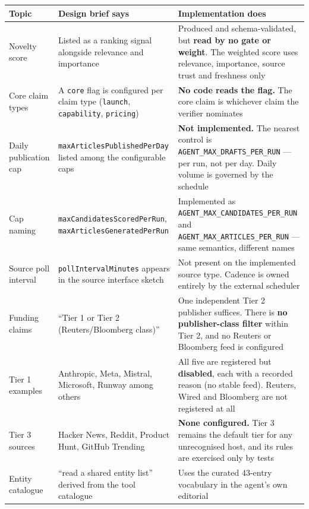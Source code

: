 \documentclass[11pt,a4paper]{article}
\newcommand{\var}[1]{\texttt{\small\hyphenpenalty=0\exhyphenpenalty=0\relax #1}}
\newcommand{\us}{\_\discretionary{}{}{}}
\newcommand{\brk}{\hyphenpenalty=0\exhyphenpenalty=0\relax}
\newcommand{\code}[1]{\texttt{\small\brk #1}}
\begin{document}
\begin{center}
\footnotesize
\begin{tabularx}{\textwidth}{@{}>{\RaggedRight}p{4.2cm} >{\RaggedRight}p{4.9cm} >{\RaggedRight}X@{}}
\toprule
\textbf{Topic} & \textbf{Design brief says} & \textbf{Implementation does} \\
\midrule
Novelty score & Listed as a ranking signal alongside relevance and importance &
  Produced and schema-validated, but \textbf{read by no gate or weight}. The
  weighted score uses relevance, importance, source trust and freshness only \\
Core claim types & A \code{core} flag is configured per claim type
  (\code{launch}, \code{capability}, \code{pricing}) &
  \textbf{No code reads the flag.} The core claim is whichever claim the verifier
  nominates \\
Daily publication cap & \code{maxArticlesPublishedPerDay} listed among the
  configurable caps & \textbf{Not implemented.} The nearest control is
  \var{AGENT\us MAX\us DRAFTS\us PER\us RUN} --- per run, not per day. Daily volume
  is governed by the schedule \\
Cap naming & \code{maxCandidatesScoredPerRun},
  \code{maxArticlesGeneratedPerRun} & Implemented as
  \var{AGENT\us MAX\us CANDIDATES\us PER\us RUN} and
  \var{AGENT\us MAX\us ARTICLES\us PER\us RUN} --- same semantics, different names \\
Source poll interval & \code{pollIntervalMinutes} appears in the source interface
  sketch & Not present on the implemented source type. Cadence is owned entirely
  by the external scheduler \\
Funding claims & ``Tier 1 or Tier 2 (Reuters/Bloomberg class)'' &
  One independent Tier 2 publisher suffices. There is \textbf{no publisher-class
  filter} within Tier 2, and no Reuters or Bloomberg feed is configured \\
Tier 1 examples & Anthropic, Meta, Mistral, Microsoft, Runway among others &
  All five are registered but \textbf{disabled}, each with a recorded reason (no
  stable feed). Reuters, Wired and Bloomberg are not registered at all \\
Tier 3 sources & Hacker News, Reddit, Product Hunt, GitHub Trending &
  \textbf{None configured.} Tier 3 remains the default tier for any unrecognised
  host, and its rules are exercised only by tests \\
Entity catalogue & ``read a shared entity list'' derived from the tool catalogue &
  Uses the curated 43-entry vocabulary in the agent's own editorial

\end{tabularx}
\end{center}
\end{document}
